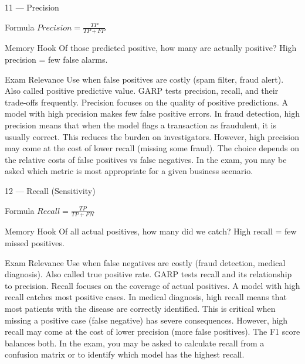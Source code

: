 \documentclass[aspectratio=169,8pt]{beamer}
\begin{document}
	\begin{frame}{11 --- Precision}
		\begin{block}{Formula}
			$Precision = \frac{TP}{TP + FP}$
		\end{block}
		\begin{block}{Memory Hook}
			Of those predicted positive, how many are actually positive? High precision = few false alarms.
		\end{block}
		\begin{block}{Exam Relevance}
			Use when false positives are costly (spam filter, fraud alert). Also called positive predictive value. GARP tests precision, recall, and their trade-offs frequently. Precision focuses on the quality of positive predictions. A model with high precision makes few false positive errors. In fraud detection, high precision means that when the model flags a transaction as fraudulent, it is usually correct. This reduces the burden on investigators. However, high precision may come at the cost of lower recall (missing some fraud). The choice depends on the relative costs of false positives vs false negatives. In the exam, you may be asked which metric is most appropriate for a given business scenario.
		\end{block}
	\end{frame}
	
	\begin{frame}{12 --- Recall (Sensitivity)}
		\begin{block}{Formula}
			$Recall = \frac{TP}{TP + FN}$
		\end{block}
		\begin{block}{Memory Hook}
			Of all actual positives, how many did we catch? High recall = few missed positives.
		\end{block}
		\begin{block}{Exam Relevance}
			Use when false negatives are costly (fraud detection, medical diagnosis). Also called true positive rate. GARP tests recall and its relationship to precision. Recall focuses on the coverage of actual positives. A model with high recall catches most positive cases. In medical diagnosis, high recall means that most patients with the disease are correctly identified. This is critical when missing a positive case (false negative) has severe consequences. However, high recall may come at the cost of lower precision (more false positives). The F1 score balances both. In the exam, you may be asked to calculate recall from a confusion matrix or to identify which model has the highest recall.
		\end{block}
	\end{frame}
	
\end{document}
